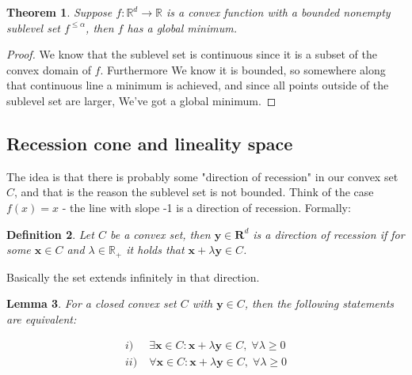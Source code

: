 \documentclass{article}
\newtheorem{theorem}{Theorem}[section]
\newtheorem{definition}[theorem]{Definition}
\newtheorem{lemma}[theorem]{Lemma}
\begin{document}
		\begin{theorem}
			Suppose $f:\mathbb{R}^d\to\mathbb{R}$ is a convex function with a bounded nonempty sublevel set $f^{\le\alpha}$, then $f$ has a global minimum.
		\end{theorem}
		
		\begin{proof}
			We know that the sublevel set is continuous since it is a subset of the convex domain of $f$. Furthermore We know it is bounded, so somewhere along that continuous line a minimum is achieved, and since all points outside of the sublevel set are larger, We've got a global minimum.
		\end{proof}
		
	\subsection{Recession cone and lineality space}
	
		The idea is that there is probably some "direction of recession" in our convex set $C$, and that is the reason the sublevel set is not bounded. Think of the case $f(x) = x$ - the line with slope -1 is a direction of recession. Formally:
		
		\begin{definition}
			Let $C$ be a convex set, then $\mathbf{y}\in \mathbf{R}^d$ is a direction of recession if for some $\mathbf{x}\in C$ and $\lambda \in \mathbb{R}_+ $ it holds that $\mathbf{x}+\lambda\mathbf{y}\in C$.
		\end{definition}
		
		Basically the set extends infinitely in that direction.
		
		\begin{lemma}
			For a closed convex set $C$ with $\mathbf{y}\in C$, then the following statements are equivalent:
			
			\begin{align*}
				i)&\; \exists\mathbf{x}\in C: \mathbf{x} + \lambda\mathbf{y} \in C,\;\forall\lambda\ge 0\\
				ii)&\; \forall\mathbf{x}\in C: \mathbf{x} + \lambda\mathbf{y} \in C,\;\forall\lambda\ge 0
			\end{align*}
		\end{lemma}
		
\end{document}
